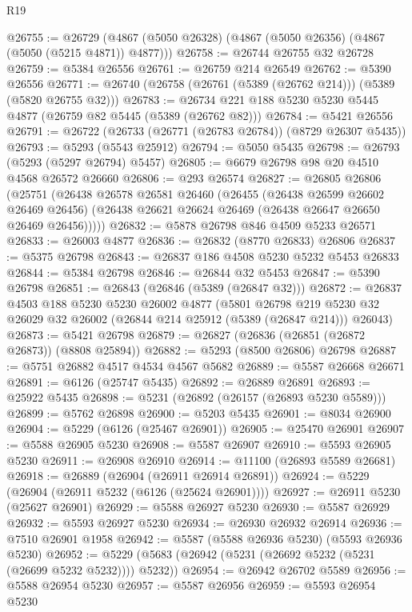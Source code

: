 \begin{lexlean}{R19}
\begin{coremodule}
@26755 := @26729 (@4867 (@5050 @26328) (@4867 (@5050 @26356) (@4867 (@5050 (@5215 @4871)) @4877)))
@26758 := @26744 @26755 @32 @26728
@26759 := @5384 @26556
@26761 := @26759 @214 @26549
@26762 := @5390 @26556
@26771 := @26740 (@26758 (@26761 (@5389 (@26762 @214))) (@5389 (@5820 @26755 @32)))
@26783 := @26734 @221 @188 @5230 @5230 @5445 @4877 (@26759 @82 @5445 (@5389 (@26762 @82)))
@26784 := @5421 @26556
@26791 := @26722 (@26733 (@26771 (@26783 @26784)) (@8729 @26307 @5435))
@26793 := @5293 (@5543 @25912)
@26794 := @5050 @5435
@26798 := @26793 (@5293 (@5297 @26794) @5457)
@26805 := @6679 @26798 @98 @20 @4510 @4568 @26572 @26660
@26806 := @293 @26574
@26827 := @26805
    @26806
    (@25751
      (@26438
        @26578
        @26581
        @26460
        (@26455
          (@26438 @26599 @26602 @26469 @26456)
          (@26438 @26621 @26624 @26469 (@26438 @26647 @26650 @26469 @26456)))))
@26832 := @5878 @26798 @846 @4509 @5233 @26571
@26833 := @26003 @4877
@26836 := @26832 (@8770 @26833) @26806
@26837 := @5375 @26798
@26843 := @26837 @186 @4508 @5230 @5232 @5453 @26833
@26844 := @5384 @26798
@26846 := @26844 @32 @5453
@26847 := @5390 @26798
@26851 := @26843 (@26846 (@5389 (@26847 @32)))
@26872 := @26837
    @4503
    @188
    @5230
    @5230
    @26002
    @4877
    (@5801
      @26798
      @219
      @5230
      @32
      @26029
      @32
      @26002
      (@26844 @214 @25912 (@5389 (@26847 @214)))
      @26043)
@26873 := @5421 @26798
@26879 := @26827 (@26836 (@26851 (@26872 @26873)) (@8808 @25894))
@26882 := @5293 (@8500 @26806) @26798
@26887 := @5751 @26882 @4517 @4534 @4567 @5682
@26889 := @5587 @26668 @26671
@26891 := @6126 (@25747 @5435)
@26892 := @26889 @26891
@26893 := @25922 @5435
@26898 := @5231 (@26892 (@26157 (@26893 @5230 @5589)))
@26899 := @5762 @26898
@26900 := @5203 @5435
@26901 := @8034 @26900
@26904 := @5229 (@6126 (@25467 @26901))
@26905 := @25470 @26901
@26907 := @5588 @26905 @5230
@26908 := @5587 @26907
@26910 := @5593 @26905 @5230
@26911 := @26908 @26910
@26914 := @11100 (@26893 @5589 @26681)
@26918 := @26889 (@26904 (@26911 @26914 @26891))
@26924 := @5229 (@26904 (@26911 @5232 (@6126 (@25624 @26901))))
@26927 := @26911 @5230 (@25627 @26901)
@26929 := @5588 @26927 @5230
@26930 := @5587 @26929
@26932 := @5593 @26927 @5230
@26934 := @26930 @26932 @26914
@26936 := @7510 @26901 @1958
@26942 := @5587 (@5588 @26936 @5230) (@5593 @26936 @5230)
@26952 := @5229 (@5683 (@26942 (@5231 (@26692 @5232 (@5231 (@26699 @5232 @5232)))) @5232))
@26954 := @26942 @26702 @5589
@26956 := @5588 @26954 @5230
@26957 := @5587 @26956
@26959 := @5593 @26954 @5230

\end{coremodule}
\end{lexlean}
